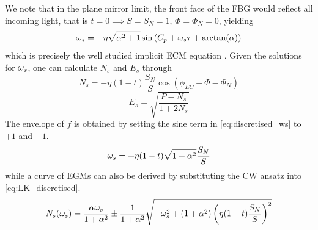 %
We note that in the plane mirror limit, the front face of the FBG would reflect all incoming light, that is $ t = 0 \implies S = S_N = 1, \, \Phi = \Phi_N = 0$, yielding 
%
\begin{equation*}
    \omega_s = - \eta \sqrt{\alpha^2 + 1} \sin{(C_p + \omega_s \tau + \arctan(\alpha) })
\end{equation*}
%
which is precisely the well studied implicit ECM equation \cite{rottschafer2007ecm}. Given the solutions for $\omega_s$, one can calculate $N_s$ and $E_s$ through
%
\begin{equation}
    N_s = -\eta (1-t) \frac{S_N}{S} \cos{\left( \phi_{EC} + \Phi - \Phi_N \right)}  
\end{equation}
%
\begin{equation}
    E_s = \sqrt{\frac{P - N_s}{1 + 2 N_s}}
\end{equation}
%
The envelope of $f$ is obtained by setting the sine term in \eqref{eq:discretised_ws} to $+1$ and $-1$.
%
\begin{equation}
    \label{eq:discretised_ws_envelope}
    \omega_s = \mp \eta (1-t) \sqrt{1+\alpha^2}\frac{S_N}{S}
\end{equation}
while a curve of EGMs can also be derived by substituting the CW ansatz into \eqref{eq:LK_discretised}.
%
\begin{equation}
    \label{eq:discretised_Ns_curve}
    N_s(\omega_s) = \frac{\alpha \omega_s}{1+\alpha^2} \pm \frac{1}{1+\alpha^2}\sqrt{-\omega_s^2 + (1+\alpha^2) \left(\eta (1-t) \frac{S_N}{S} \right)^2}
\end{equation}
%
    
    
    
